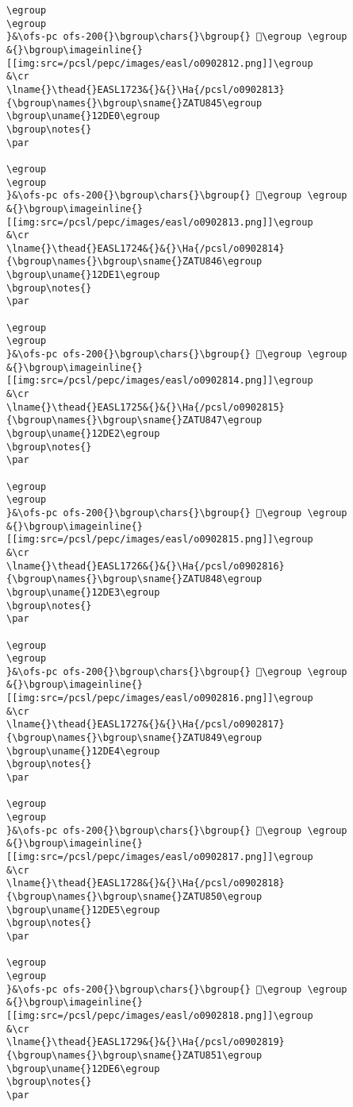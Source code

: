 \begin{verbatim}
\egroup
\egroup
}&\ofs-pc ofs-200{}\bgroup\chars{}\bgroup{} 𒷟\egroup \egroup
&{}\bgroup\imageinline{}[[img:src=/pcsl/pepc/images/easl/o0902812.png]]\egroup
&\cr
\lname{}\thead{}EASL1723&{}&{}\Ha{/pcsl/o0902813}{\bgroup\names{}\bgroup\sname{}ZATU845\egroup
\bgroup\uname{}12DE0\egroup
\bgroup\notes{}
\par 

\egroup
\egroup
}&\ofs-pc ofs-200{}\bgroup\chars{}\bgroup{} 𒷠\egroup \egroup
&{}\bgroup\imageinline{}[[img:src=/pcsl/pepc/images/easl/o0902813.png]]\egroup
&\cr
\lname{}\thead{}EASL1724&{}&{}\Ha{/pcsl/o0902814}{\bgroup\names{}\bgroup\sname{}ZATU846\egroup
\bgroup\uname{}12DE1\egroup
\bgroup\notes{}
\par 

\egroup
\egroup
}&\ofs-pc ofs-200{}\bgroup\chars{}\bgroup{} 𒷡\egroup \egroup
&{}\bgroup\imageinline{}[[img:src=/pcsl/pepc/images/easl/o0902814.png]]\egroup
&\cr
\lname{}\thead{}EASL1725&{}&{}\Ha{/pcsl/o0902815}{\bgroup\names{}\bgroup\sname{}ZATU847\egroup
\bgroup\uname{}12DE2\egroup
\bgroup\notes{}
\par 

\egroup
\egroup
}&\ofs-pc ofs-200{}\bgroup\chars{}\bgroup{} 𒷢\egroup \egroup
&{}\bgroup\imageinline{}[[img:src=/pcsl/pepc/images/easl/o0902815.png]]\egroup
&\cr
\lname{}\thead{}EASL1726&{}&{}\Ha{/pcsl/o0902816}{\bgroup\names{}\bgroup\sname{}ZATU848\egroup
\bgroup\uname{}12DE3\egroup
\bgroup\notes{}
\par 

\egroup
\egroup
}&\ofs-pc ofs-200{}\bgroup\chars{}\bgroup{} 𒷣\egroup \egroup
&{}\bgroup\imageinline{}[[img:src=/pcsl/pepc/images/easl/o0902816.png]]\egroup
&\cr
\lname{}\thead{}EASL1727&{}&{}\Ha{/pcsl/o0902817}{\bgroup\names{}\bgroup\sname{}ZATU849\egroup
\bgroup\uname{}12DE4\egroup
\bgroup\notes{}
\par 

\egroup
\egroup
}&\ofs-pc ofs-200{}\bgroup\chars{}\bgroup{} 𒷤\egroup \egroup
&{}\bgroup\imageinline{}[[img:src=/pcsl/pepc/images/easl/o0902817.png]]\egroup
&\cr
\lname{}\thead{}EASL1728&{}&{}\Ha{/pcsl/o0902818}{\bgroup\names{}\bgroup\sname{}ZATU850\egroup
\bgroup\uname{}12DE5\egroup
\bgroup\notes{}
\par 

\egroup
\egroup
}&\ofs-pc ofs-200{}\bgroup\chars{}\bgroup{} 𒷥\egroup \egroup
&{}\bgroup\imageinline{}[[img:src=/pcsl/pepc/images/easl/o0902818.png]]\egroup
&\cr
\lname{}\thead{}EASL1729&{}&{}\Ha{/pcsl/o0902819}{\bgroup\names{}\bgroup\sname{}ZATU851\egroup
\bgroup\uname{}12DE6\egroup
\bgroup\notes{}
\par 


\end{verbatim}
